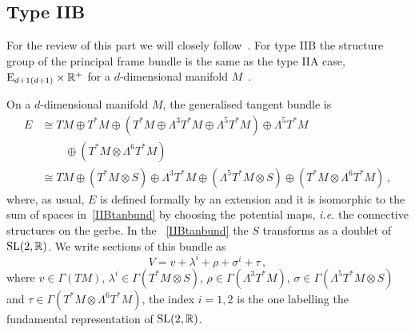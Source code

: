 \documentclass[debug]{phd}
\begin{document}
					
			\subsection{Type IIB}
				For the review of this part we will closely follow~\cite{AshmoreECY}.
For type IIB the structure group of the principal frame bundle is the same as the type IIA case, $\mathrm{E}_{d+1(d+1)}\times \mathbb{R}^+$ for a $d$-dimensional manifold $M$~\cite{waldram5, spheres}.

On a $d$-dimensional manifold $M$, the generalised tangent bundle is
								\begin{equation}\label{IIBtanbund}
									\begin{split}
										E & \cong TM\oplus T^{*}M\oplus(T^{*}M\oplus\Lambda^{3}T^{*}M\oplus\Lambda^{5}T^{*}M)\oplus\Lambda^{5}T^{*}M \\
												& \phantom{\cong \oplus} \oplus(T^{*}M\otimes\Lambda^{6}T^{*}M) \\
										 & \cong TM\oplus(T^{*}M\otimes S)\oplus\Lambda^{3}T^{*}M\oplus(\Lambda^{5}T^{*}M\otimes S)\oplus(T^{*}M\otimes\Lambda^{6}T^{*}M) \, ,
									\end{split}
								\end{equation}
						where, as usual, $E$ is defined formally by an extension and it is isomorphic to the sum of spaces in~\eqref{IIBtanbund} by choosing the potential maps, \emph{i.e.} the connective structures on the gerbe.
						In the ~\eqref{IIBtanbund} the $S$ transforms as a doublet of $\mathrm{SL}(2,\mathbb{R})$. 
						We write sections of this bundle as
								\begin{equation}\label{eq:V-IIB}
									V=v+\lambda^{i}+\rho+\sigma^{i}+\tau \, ,
								\end{equation}
						where $v\in\Gamma(TM)$, $\lambda^{i}\in\Gamma(T^{*}M\otimes S)$, $\rho\in\Gamma(\Lambda^{3}T^{*}M)$, $\sigma\in\Gamma(\Lambda^{5}T^{*}M\otimes S)$ and $\tau\in\Gamma(T^{*}M\otimes\Lambda^{6}T^{*}M)$, the index $i =1, 2$ is the one labelling the fundamental representation of $\mathrm{SL}(2,\mathbb{R})$.
						
\end{document}

